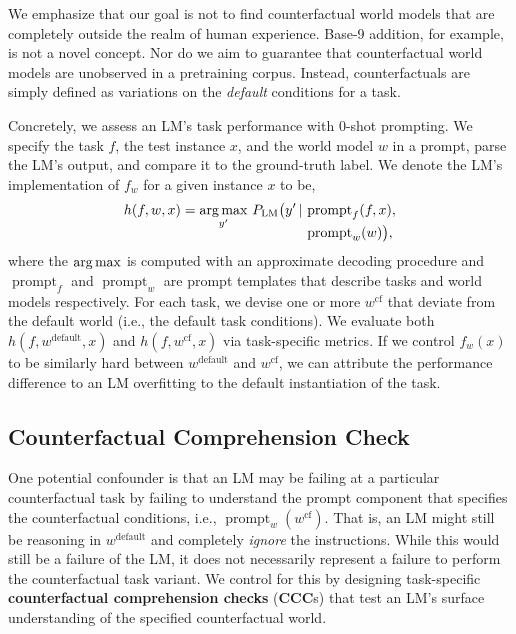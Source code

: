 We emphasize that our goal is not to find counterfactual world models that are completely outside the realm of human experience. Base-9 addition, for example, is not a novel concept. Nor do we aim to guarantee that counterfactual world models are unobserved in a pretraining corpus.
Instead, counterfactuals are simply defined as variations on the \emph{default} conditions for a task. %



Concretely, we assess an LM's task performance with 0-shot prompting. We specify the task $f$, the test instance $x$, and the world model $w$ in a prompt, parse the LM's output, and compare it to the ground-truth label. We denote the LM's implementation of $f_w$ for a given instance $x$ to be, 
\begin{align*}
    h(f, w, x) = \operatorname*{arg\,max}_{y'}\, P_\text{LM}\big(y' \, | \, & \operatorname{prompt}_{f}(f, x), \\[-.7em] & \operatorname{prompt}_{w}(w)\big),
\end{align*}
where the $\operatorname*{arg\,max}$ is computed with an approximate decoding procedure and $\operatorname{prompt}_f$ and $\operatorname{prompt}_w$ are prompt templates that describe tasks and world models respectively.
For each task, we devise one or more $w^{\text{cf}}$ that deviate from the default world (i.e., the default task conditions).
We evaluate both $h(f, w^{\text{default}}, x)$ and $h(f, w^{\text{cf}}, x)$ via task-specific metrics. If we control $f_w(x)$ to be similarly hard between $w^{\text{default}}$ and $w^{\text{cf}}$, we can attribute the performance difference to an LM overfitting to the default instantiation of the task.





\subsection{Counterfactual Comprehension Check} \label{subsec:ccc}
One potential confounder is that an LM may be failing at a particular counterfactual task by failing to understand the prompt component that specifies the counterfactual conditions, i.e., $\operatorname{prompt}_w(w^{\text{cf}})$. That is, an LM might still be reasoning in $w^{\text{default}}$ and completely \emph{ignore} the instructions. While this would still be a failure of the LM, it does not necessarily represent a failure to perform the counterfactual task variant. We control for this by designing task-specific \textbf{counterfactual comprehension checks} (\textbf{CCC}s) that test an LM's surface understanding of the specified counterfactual world.

